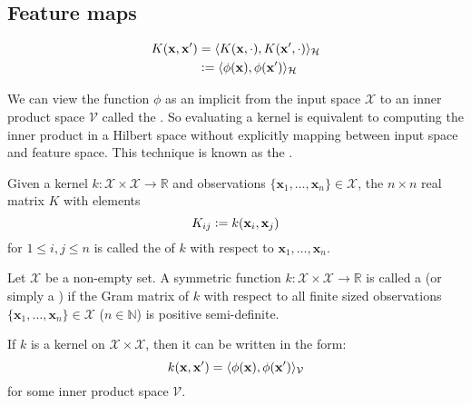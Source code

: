 \subsection{Feature maps}

\begin{align}
  K(\mathbf{x}, \mathbf{x}^\prime) &= \langle K(\mathbf{x}, \cdot), K(\mathbf{x}^\prime, \cdot)\rangle_\mathcal{H} \\
                                   &\vcentcolon= \langle\phi(\mathbf{x}), \phi(\mathbf{x}^\prime)\rangle_\mathcal{H}
\end{align}

We can view the function $\phi$ as an implicit  from the input space $\mathcal{X}$ to an inner product space $\mathcal{V}$ called the . So evaluating a kernel is equivalent to computing the inner product in a Hilbert space without explicitly mapping between input space and feature space. This technique is known as the .

\begin{definition}
Given a kernel $k : \mathcal{X} \times \mathcal{X} \to \mathbb{R}$ and observations $\{ \mathbf{x}_1, \dotsc, \mathbf{x}_n \} \in \mathcal{X}$, the $n \times n$ real matrix $K$ with elements
\begin{equation}
  K_{ij} \vcentcolon= k(\mathbf{x}_i, \mathbf{x}_j)
\end{equation}
for $1 \leq i, j \leq n$ is called the  of $k$ with respect to $\mathbf{x}_1, \dotsc, \mathbf{x}_n$.
\end{definition}


\begin{definition}
Let $\mathcal{X}$ be a non-empty set. A symmetric function $k : \mathcal{X} \times \mathcal{X} \to \mathbb{R}$ is called a  (or simply a ) if the Gram matrix of $k$ with respect to all finite sized observations $\{ \mathbf{x}_1, \dotsc, \mathbf{x}_n \} \in \mathcal{X}$ ($n \in \mathbb{N}$) is positive semi-definite.
\end{definition}

\begin{theorem}
If $k$ is a kernel on $\mathcal{X} \times \mathcal{X}$, then it can be written in the form:
\begin{equation}
  k(\mathbf{x}, \mathbf{x}^\prime) = \langle\phi(\mathbf{x}), \phi(\mathbf{x}^\prime)\rangle_\mathcal{V}
\end{equation}
for some inner product space $\mathcal{V}$.
\end{theorem}


